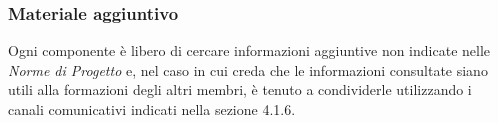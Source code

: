 	\subsubsection{Materiale aggiuntivo}
	Ogni componente è libero di cercare informazioni aggiuntive non indicate nelle \textit{Norme di Progetto} e, nel caso in cui creda che le informazioni consultate siano utili  alla formazioni degli altri membri, è tenuto a condividerle utilizzando i canali comunicativi indicati nella sezione 4.1.6.